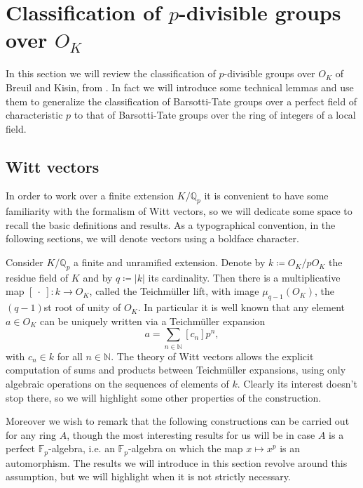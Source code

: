 \section{Classification of \texorpdfstring{$p$}{p}-divisible groups
	over \texorpdfstring{$O_{ K }$}{the ring of integers of K}}
In this section we will review the classification
of $p$-divisible groups over $O_K$ of Breuil and Kisin, from \cite[Appendix A]{Kisin}.
In fact we will introduce some technical lemmas and use them to
generalize the classification of Barsotti-Tate groups over a perfect field
of characteristic $p$
to that of Barsotti-Tate groups over the ring of integers of a local field.



\subsection{Witt vectors}
In order to work over a finite extension $K/\mathbb{Q}_p$ it is convenient to
have some familiarity with the formalism of Witt vectors, so we will dedicate some 
space to recall the basic definitions and results.
As a typographical convention, in the following sections, we will
denote vectors using a boldface character.


\begin{rem}[Motivation]
	Consider $K/\mathbb{Q}_p$ a finite and unramified extension.
	Denote by $k \coloneqq O_K/pO_K$ the residue field of $K$ and by $q \coloneqq \left| k \right|$
	its cardinality.
	Then there is a multiplicative map $[\ \cdot \ ]\colon k \to O_K$,
	called the Teichmüller lift, with image $\mu_{q-1}(O_K)$,
	the $(q-1)$st root of unity of $O_K$.
	In particular it is well known that any element $a \in O_K$
	can be uniquely written via a Teichmüller expansion
	\begin{equation*}
		a = \sum_{n \in \mathbb{N}} [c_n] p^n
	,\end{equation*}
	with $c_n \in k$ for all $n \in \mathbb{N}$.
	The theory of Witt vectors allows the explicit computation of sums and
	products between Teichmüller expansions, using only
	algebraic operations on the sequences of elements of $k$.
	Clearly its interest doesn't stop there, so we will highlight some 
	other properties of the construction.

	Moreover we wish to remark that the following constructions
	can be carried out for any ring $A$, though the most interesting
	results for us will be in case $A$ is a perfect $\mathbb{F}_p$-algebra,
	i.e. an $\mathbb{F}_p$-algebra on which the map $x \mapsto x^p$
	is an automorphism.
	The results we will introduce in this section
	revolve around this assumption, but we will highlight when
	it is not strictly necessary.
\end{rem}


